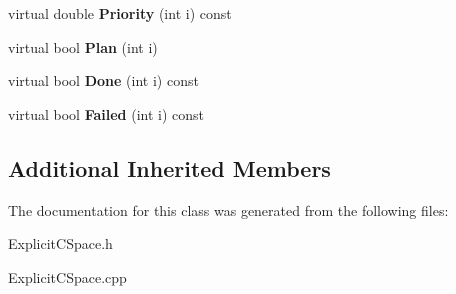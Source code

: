 \begin{DoxyCompactItemize}
\item 
virtual double {\bfseries Priority} (int i) const \label{classBisectionEpsilonExplicitEdgePlanner_a208461946ce16e7e3460c159712cafd4}

\item 
virtual bool {\bfseries Plan} (int i)\label{classBisectionEpsilonExplicitEdgePlanner_a8c2c51be37bc99800d7efed16522ee69}

\item 
virtual bool {\bfseries Done} (int i) const \label{classBisectionEpsilonExplicitEdgePlanner_a41ecb7929d729bdefc32d34fb33e5ba7}

\item 
virtual bool {\bfseries Failed} (int i) const \label{classBisectionEpsilonExplicitEdgePlanner_a207956fb105a9210e99f04ff47a995e6}

\end{DoxyCompactItemize}
\subsection*{Additional Inherited Members}


The documentation for this class was generated from the following files\+:\begin{DoxyCompactItemize}
\item 
Explicit\+C\+Space.\+h\item 
Explicit\+C\+Space.\+cpp\end{DoxyCompactItemize}
